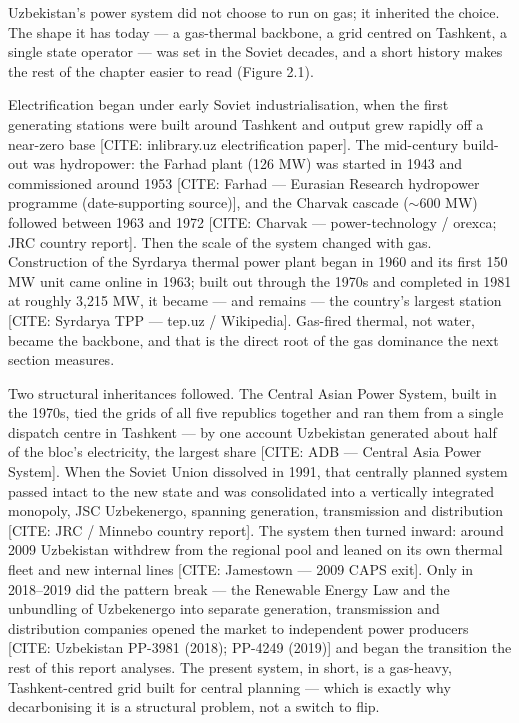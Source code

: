 \documentclass[10pt,twocolumn]{article}
\newcommand{\mk}[1]{{\color{amber}\small #1}}
\begin{document}
Uzbekistan's power system did not choose to run on gas; it inherited the choice. The shape it has today --- a gas-thermal backbone, a grid centred on Tashkent, a single state operator --- was set in the Soviet decades, and a short history makes the rest of the chapter easier to read (Figure 2.1).

Electrification began under early Soviet industrialisation, when the first generating stations were built around Tashkent and output grew rapidly off a near-zero base \mk{[CITE: inlibrary.uz electrification paper]}. The mid-century build-out was hydropower: the Farhad plant (126 MW) was started in 1943 and commissioned around 1953 \mk{[CITE: Farhad --- Eurasian Research hydropower programme (date-supporting source)]}, and the Charvak cascade ($\sim$600 MW) followed between 1963 and 1972 \mk{[CITE: Charvak --- power-technology / orexca; JRC country report]}. Then the scale of the system changed with gas. Construction of the Syrdarya thermal power plant began in 1960 and its first 150 MW unit came online in 1963; built out through the 1970s and completed in 1981 at roughly 3,215 MW, it became --- and remains --- the country's largest station \mk{[CITE: Syrdarya TPP --- tep.uz / Wikipedia]}. Gas-fired thermal, not water, became the backbone, and that is the direct root of the gas dominance the next section measures.

Two structural inheritances followed. The Central Asian Power System, built in the 1970s, tied the grids of all five republics together and ran them from a single dispatch centre in Tashkent --- by one account Uzbekistan generated about half of the bloc's electricity, the largest share \mk{[CITE: ADB --- Central Asia Power System]}. When the Soviet Union dissolved in 1991, that centrally planned system passed intact to the new state and was consolidated into a vertically integrated monopoly, JSC Uzbekenergo, spanning generation, transmission and distribution \mk{[CITE: JRC / Minnebo country report]}. The system then turned inward: around 2009 Uzbekistan withdrew from the regional pool and leaned on its own thermal fleet and new internal lines \mk{[CITE: Jamestown --- 2009 CAPS exit]}. Only in 2018--2019 did the pattern break --- the Renewable Energy Law and the unbundling of Uzbekenergo into separate generation, transmission and distribution companies opened the market to independent power producers \mk{[CITE: Uzbekistan PP-3981 (2018); PP-4249 (2019)]} and began the transition the rest of this report analyses. The present system, in short, is a gas-heavy, Tashkent-centred grid built for central planning --- which is exactly why decarbonising it is a structural problem, not a switch to flip.
\end{document}
